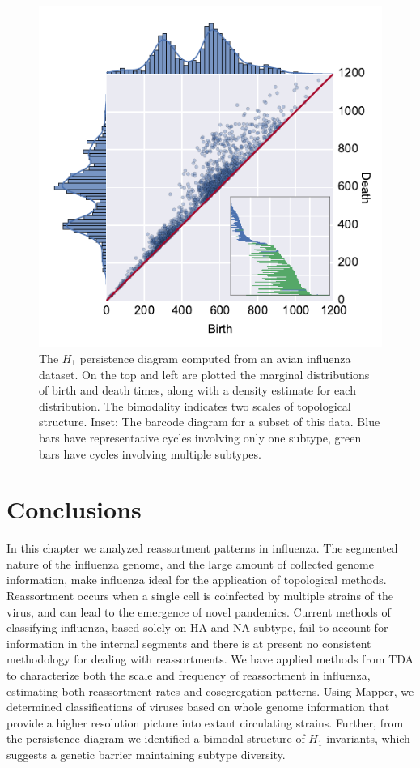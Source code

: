 \begin{figure}
\centering
\includegraphics[width=\columnwidth]{./fig/influenza/flu_scatterplot.pdf}
\caption[$H_1$ persistence diagram computed from an avian influenza dataset.]{The $H_1$ persistence diagram computed from an avian influenza dataset. On the top and left are plotted the marginal distributions of birth and death times, along with a density estimate for each distribution. The bimodality indicates two scales of topological structure. Inset: The barcode diagram for a subset of this data. Blue bars have representative cycles involving only one subtype, green bars have cycles involving multiple subtypes.}
\label{fig:flu:scatterplot}
\end{figure}

\section{Conclusions}
\label{flu:conclusions}

In this chapter we analyzed reassortment patterns in influenza.
The segmented nature of the influenza genome, and the large amount of collected genome information, make influenza ideal for the application of topological methods.
Reassortment occurs when a single cell is coinfected by multiple strains of the virus, and can lead to the emergence of novel pandemics.
Current methods of classifying influenza, based solely on HA and NA subtype, fail to account for information in the internal segments and there is at present no consistent methodology for dealing with reassortments.
We have applied methods from TDA to characterize both the scale and frequency of reassortment in influenza, estimating both reassortment rates and cosegregation patterns.
Using Mapper, we determined classifications of viruses based on whole genome information that provide a higher resolution picture into extant circulating strains.
Further, from the persistence diagram we identified a bimodal structure of $H_1$ invariants, which suggests a genetic barrier maintaining subtype diversity.